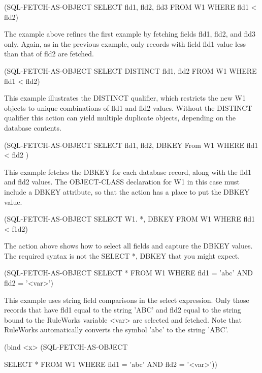 {{(SQL-FETCH-AS-OBJECT SELECT fld1, fld2, fld3 FROM W1 WHERE
fld1 < fld2)



The example above refines the first example by fetching
fields fld1, fld2, and fld3 only. Again, as in the previous
example, only records with field fld1 value less than that of
fld2 are fetched.



(SQL-FETCH-AS-OBJECT SELECT DISTINCT fld1, fld2 FROM W1 WHERE
fld1 < fld2)







This example illustrates the DISTINCT qualifier, which
restricts the new W1 objects to unique combinations of fld1
and fld2 values. Without the DISTINCT qualifier this action
can yield multiple duplicate objects, depending on the
database contents.



(SQL-FETCH-AS-OBJECT SELECT fld1, fld2, DBKEY From W1 WHERE
fld1 < fld2 )



This example fetches the DBKEY for each database record,
along with the fld1 and fld2 values. The OBJECT-CLASS
declaration for W1 in this case must include a DBKEY
attribute, so that the action has a place to put the DBKEY
value.



(SQL-FETCH-AS-OBJECT SELECT W1. *, DBKEY FROM W1 WHERE fld1 <
f1d2)



The action above shows how to select all fields and capture
the DBKEY values. The required syntax is not the SELECT *,
DBKEY that you might expect.



(SQL-FETCH-AS-OBJECT SELECT * FROM W1 WHERE fld1 = 'abc' AND
fld2 = '<var>')



This example uses string field comparisons in the select
expression. Only those records that have fld1 equal to the
string 'ABC' and fld2 equal to the string bound to the
RuleWorks variable <var> are selected and fetched. Note that
RuleWorks automatically converts the symbol 'abc' to the
string 'ABC'.



(bind <x> (SQL-FETCH-AS-OBJECT

SELECT * FROM W1 WHERE fld1 = 'abc' AND fld2 = '<var>'))



}}
